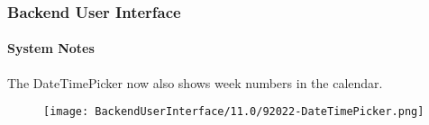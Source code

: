 %

\begin{frame}[fragile]
	\frametitle{Backend User Interface}
	\framesubtitle{System Notes}

	The DateTimePicker now also shows week numbers in the calendar.

	\begin{figure}
		\texttt{[image: BackendUserInterface/11.0/92022-DateTimePicker.png]}
	\end{figure}

\end{frame}

